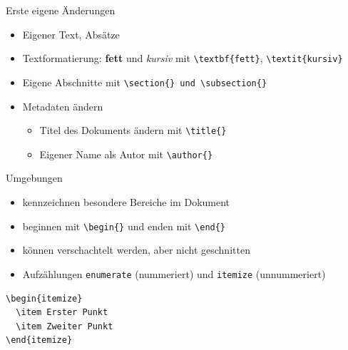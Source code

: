 \documentclass[presentation,aspectratio=169]{beamer}
\begin{document}
\begin{frame}[fragile]{Erste eigene Änderungen}
  \begin{itemize}
    \item Eigener Text, Absätze
    \item Textformatierung: \textbf{fett} und \textit{kursiv} mit \verb|\textbf{fett}|, \verb|\textit{kursiv}|
    \item Eigene Abschnitte mit \verb|\section{} und \subsection{}|
    \item Metadaten ändern
      \begin{itemize}
        \item Titel des Dokuments ändern mit \verb|\title{}|
        \item Eigener Name als Autor mit \verb|\author{}|
      \end{itemize}
  \end{itemize}
\end{frame}

\begin{frame}[fragile]{Umgebungen}
  \begin{itemize}
    \item kennzeichnen besondere Bereiche im Dokument
    \item beginnen mit \verb|\begin{}| und enden mit \verb|\end{}|
    \item können verschachtelt werden, aber nicht geschnitten
    \item Aufzählungen \verb|enumerate| (nummeriert) und \verb|itemize| (unnummeriert)
  \end{itemize}
  \begin{center}
    \centering
    \begin{verbatim}
\begin{itemize}
  \item Erster Punkt
  \item Zweiter Punkt
\end{itemize}
    \end{verbatim}
  \end{center}
\end{frame}
\end{document}
